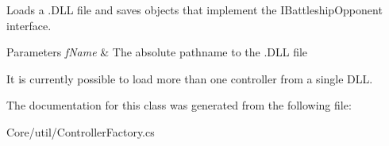 Loads a .D\-L\-L file and saves objects that implement the I\-Battleship\-Opponent interface.


\begin{DoxyParams}{Parameters}
{\em f\-Name} & The absolute pathname to the .D\-L\-L file\\
\hline
\end{DoxyParams}


It is currently possible to load more than one controller from a single D\-L\-L.

The documentation for this class was generated from the following file\-:\begin{DoxyCompactItemize}
\item 
Core/util/Controller\-Factory.\-cs\end{DoxyCompactItemize}
